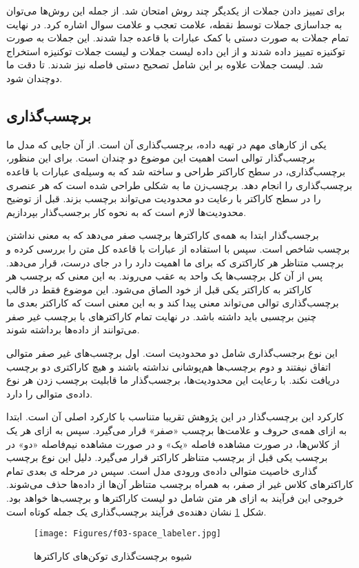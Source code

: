 برای تمییز دادن جملات از یکدیگر چند روش امتحان شد. از جمله این روش‌ها  می‌توان به جداسازی جملات توسط نقطه، علامت تعجب و علامت سوال اشاره کرد. در نهایت تمام جملات به صورت دستی با کمک عبارات با قاعده جدا شدند. این جملات به صورت توکنیزه تمییز داده‌ شدند و از این داده لیست جملات و لیست جملات توکنیزه‌ استخراج شد. لیست جملات علاوه بر این شامل تصحیح دستی فاصله نیز شدند. تا دقت ما دوچندان شود.
\subsection{برچسب‌گذاری}
\hspace{30pt}
یکی از کارهای مهم در تهیه داده، برچسب‌گذاری آن است.  از آن‌ جایی که مدل ما برچسب‌گذار توالی است اهمیت این موضوع دو چندان است. برای این منظور، برچسب‌گذاری، در سطح کاراکتر طراحی و ساخته شد که به وسیله‌ی عبارات با قاعده برچسب‌گذاری را انجام‌ دهد. برچسب‌زن ما به شکلی طراحی شده است که هر عنصری را در سطح کاراکتر با رعایت دو محدودیت می‌تواند برچسب بزند. قبل از توضیح محدودیت‌ها لازم است که به نحوه کار برجسب‌گذار بپردازیم.

برجسب‌گذار ابتدا به همه‌ی کاراکتر‌ها برچسب صفر می‌دهد که به معنی نداشتن برچسب شاخص است. سپس با استفاده از عبارات با قاعده کل متن را بررسی کرده و برچسب متناظر هر کاراکتری که برای ما اهمیت دارد را در جای درست، قرار می‌دهد. پس از آن کل برچسب‌ها یک واحد به عقب می‌روند. به این معنی که برچسب هر کاراکتر به کاراکتر یکی قبل از خود الصاق می‌شود. این موضوع فقط در قالب برچسب‌گذاری توالی می‌تواند معنی پیدا کند و به این معنی است که کاراکتر بعدی ما چنین برچسبی باید داشته باشد. در نهایت تمام کاراکتر‌های با برچسب غیر صفر می‌توانند از داده‌ها برداشته شوند.

این نوع برجسب‌گذاری شامل دو محدودیت است. اول برچسب‌های غیر صفر متوالی اتفاق نیفتند و دوم برچسب‌ها هم‌پوشانی نداشته باشند و هیچ کاراکتری دو برچسب دریافت نکند. با رعایت این محدودیت‌ها، برجسب‌گذار ما قابلیت برچسب زدن هر نوع داده‌ی متوالی را دارد.

کارکرد این برچسب‌گذار در این پژوهش تقریبا متناسب با کارکرد اصلی آن است. ابتدا به ازای همه‌ی حروف و علامت‌ها برچسب «صفر» قرار می‌گیرد. سپس به ازای هر یک از کلاس‌ها، در صورت مشاهده فاصله «یک» و در صورت مشاهده نیم‌فاصله «دو» در برچسب یکی قبل از برچسب متناظر کاراکتر قرار می‌گیرد. دليل این نوع برچسب گذاری خاصیت متوالی داده‌ی ورودی مدل است. سپس در مرحله ی بعدی تمام کاراکترهای کلاس غیر از صفر، به همراه برچسب متناظر آن‌ها از داده‌ها حذف می‌شوند. خروجی این فرآیند به ازای هر متن شامل دو لیست کاراکترها و برچسب‌ها خواهد بود. شکل \ref{fig:space_labeler} نشان دهنده‌ی فرآیند برچسب‌گذاری یک جمله کوتاه است.
\begin{figure}[H]
      \centering
      \texttt{[image: Figures/f03-space\_labeler.jpg]}
      \caption{شیوه برچست‌گذاری توکن‌های کاراکترها}
      \label{fig:space_labeler}
  \end{figure}
